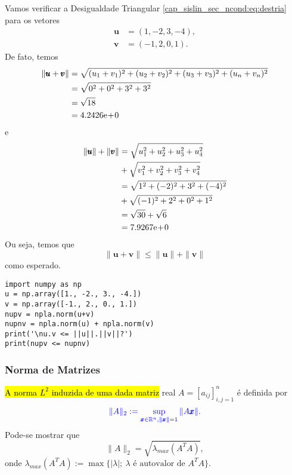 \begin{ex}
  Vamos verificar a Desigualdade Triangular \eqref{cap_sislin_sec_ncond:eq:destria} para os vetores
  \begin{align}
    \pmb{u} &= (1, -2, 3, -4),\\
    \pmb{v} &= (-1, 2, 0, 1).    
  \end{align}
  De fato, temos
  \begin{align}
    \|\pmb{u}+\pmb{v}\| &= \sqrt{(u_1+v_1)^2 + (u_2+v_2)^2 + (u_3+v_3)^2 + (u_n+v_n)^2}\\
                        &= \sqrt{0^2 + 0^2 + 3^2 + 3^2}\\
                        &= \sqrt{18}\\
                        &= 4.2426\mathrm{e}\!+\!0
  \end{align}
  e
  \begin{align}
    \|\pmb{u}\|+\|\pmb{v}\| &= \sqrt{u_1^2 + u_2^2 + u_3^2 + u_4^2} \nonumber\\
                            &+ \sqrt{v_1^2 + v_2^2 + v_3^2 + v_4^2}\\
                            &= \sqrt{1^2 + (-2)^2 + 3^2 + (-4)^2} \nonumber\\
                            &+ \sqrt{(-1)^2 + 2^2 + 0^2 + 1^2}\\
                            &= \sqrt{30} + \sqrt{6}\\
                            &= 7.9267\mathrm{e}\!+\!0
  \end{align}
  Ou seja, temos que
  \begin{equation}
    \|\pmb{u}+\pmb{v}\| \leq \|\pmb{u}\|+\|\pmb{v}\| 
  \end{equation}
  como esperado.

\begin{lstlisting}
import numpy as np
u = np.array([1., -2., 3., -4.])
v = np.array([-1., 2., 0., 1.])
nupv = npla.norm(u+v)
nupnv = npla.norm(u) + npla.norm(v)
print('\nu.v <= ||u||.||v||?')
print(nupv <= nupnv)
\end{lstlisting}

\end{ex}

\subsubsection{Norma de Matrizes}

\hl{A norma $L^2$ induzida de uma dada matriz} real $A = [a_{ij}]_{i,j=1}^n$ é definida por
\begin{equation}\color{blue}\|A\|_2 := \sup_{\pmb{x}\in\mathbb{R}^n, \|\pmb{x}\|=1} \|A\pmb{x}\|.
\end{equation}
Pode-se mostrar que
\begin{equation}
  \|A\|_2 = \sqrt{\lambda_{max}(A^TA)},
\end{equation}
onde $\lambda_{max}(A^TA) := \max\{|\lambda|;~\lambda\text{ é autovalor de }A^TA\}$.


